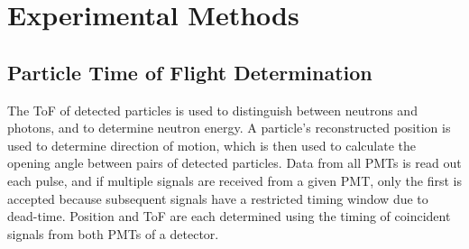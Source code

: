 \section{Experimental Methods}
\subsection{Particle Time of Flight Determination}
\label{ToF_reconstruction}
The ToF of detected particles is used to distinguish between neutrons and photons, and to determine neutron energy.
A particle's reconstructed position is used to determine direction of motion, which is then used to calculate the opening angle between pairs of detected particles.
Data from all PMTs is read out each pulse, and if multiple signals are received from a given PMT, only the first is accepted because subsequent signals have a restricted timing window due to dead-time.
Position and ToF are each determined using the timing of coincident signals from both PMTs of a detector.

